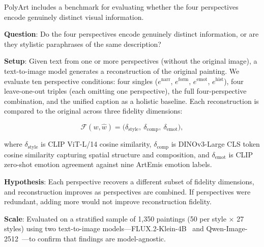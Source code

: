 PolyArt includes a benchmark for evaluating whether the four perspectives encode genuinely distinct visual information.

\textbf{Question}: Do the four perspectives encode genuinely distinct information, or are they stylistic paraphrases of the same description?

\textbf{Setup}: Given text from one or more perspectives (without the original image), a text-to-image model generates a reconstruction of the original painting.
We evaluate ten perspective conditions: four singles ($e^{\text{narr}}$, $e^{\text{form}}$, $e^{\text{emot}}$, $e^{\text{hist}}$), four leave-one-out triples (each omitting one perspective), the full four-perspective combination, and the unified caption as a holistic baseline.
Each reconstruction is compared to the original across three fidelity dimensions:

\begin{equation}
\mathcal{F}(w, \hat{w}) = \bigl(\delta_{\text{style}},\ \delta_{\text{comp}},\ \delta_{\text{emot}}\bigr),
\end{equation}

where $\delta_{\text{style}}$ is CLIP ViT-L/14 cosine similarity, $\delta_{\text{comp}}$ is DINOv3-Large CLS token cosine similarity capturing spatial structure and composition, and $\delta_{\text{emot}}$ is CLIP zero-shot emotion agreement against nine ArtEmis emotion labels.

\textbf{Hypothesis}: Each perspective recovers a different subset of fidelity dimensions, and reconstruction improves as perspectives are combined.
If perspectives were redundant, adding more would not improve reconstruction fidelity.

\textbf{Scale}: Evaluated on a stratified sample of 1,350 paintings (50 per style $\times$ 27 styles) using two text-to-image models---FLUX.2-Klein-4B~\cite{flux2} and Qwen-Image-2512~\cite{qwenimage}---to confirm that findings are model-agnostic.

